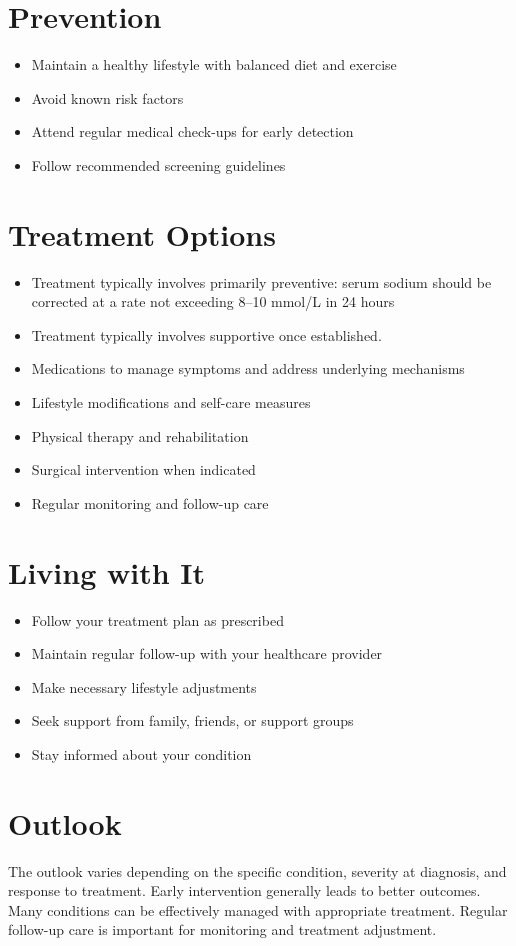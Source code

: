 \section{Prevention}
\begin{itemize}[noitemsep]
  \item Maintain a healthy lifestyle with balanced diet and exercise
  \item Avoid known risk factors
  \item Attend regular medical check-ups for early detection
  \item Follow recommended screening guidelines
\end{itemize}
\section{Treatment Options}
\begin{itemize}[noitemsep]
  \item Treatment typically involves primarily preventive: serum sodium should be corrected at a rate not exceeding 8--10 mmol/L in 24 hours
  \item Treatment typically involves supportive once established.
  \item Medications to manage symptoms and address underlying mechanisms
  \item Lifestyle modifications and self-care measures
  \item Physical therapy and rehabilitation
  \item Surgical intervention when indicated
  \item Regular monitoring and follow-up care
\end{itemize}
\section{Living with It}
\begin{itemize}[noitemsep]
  \item Follow your treatment plan as prescribed
  \item Maintain regular follow-up with your healthcare provider
  \item Make necessary lifestyle adjustments
  \item Seek support from family, friends, or support groups
  \item Stay informed about your condition
\end{itemize}
\section{Outlook}
The outlook varies depending on the specific condition, severity at diagnosis, and response to treatment. Early intervention generally leads to better outcomes. Many conditions can be effectively managed with appropriate treatment. Regular follow-up care is important for monitoring and treatment adjustment.
